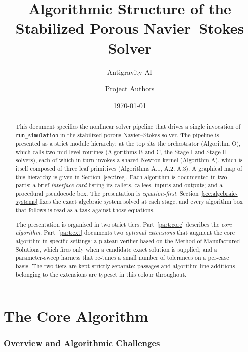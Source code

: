 \documentclass{article}
\title{Algorithmic Structure of the Stabilized Porous Navier--Stokes Solver}
\author{Antigravity AI \and Project Authors}
\date{\today}
\newcommand{\code}[1]{\texttt{\small #1}}
\newcommand{\extline}[1]{{\color{extcolor}#1}}
\begin{document}
\maketitle

\begin{abstract}
\sloppy
This document specifies the nonlinear solver pipeline that drives a
single invocation of \code{run\_simulation} in the stabilized porous
Navier--Stokes solver. The pipeline is presented as a strict module
hierarchy: at the top sits the orchestrator (Algorithm O), which calls
two mid-level routines (Algorithms B and C, the Stage I and Stage II
solvers), each of which in turn invokes a shared Newton kernel
(Algorithm A), which is itself composed of three leaf primitives
(Algorithms A.1, A.2, A.3). A graphical map of this hierarchy is given
in Section~\ref{sec:tree}. Each algorithm is documented in two parts:
a brief \emph{interface card} listing its callers, callees, inputs and
outputs; and a procedural pseudocode box. The presentation is
\emph{equation-first}: Section~\ref{sec:algebraic-systems} fixes the exact
algebraic system solved at each stage, and every algorithm box that
follows is read as a task against those equations.

The presentation is organised in two strict tiers. Part~\ref{part:core}
describes the \emph{core algorithm}. Part~\ref{part:ext} documents two
\emph{optional extensions} that augment the core algorithm in specific
settings: a plateau verifier based on the Method of Manufactured
Solutions, which fires only when a candidate exact solution is supplied;
and a parameter-sweep harness that re-tunes a small number of
tolerances on a per-case basis. The two tiers are kept strictly
separate: passages and algorithm-line additions belonging to the
extensions are typeset in \extline{this colour} throughout.
\end{abstract}

\tableofcontents

\part{The Core Algorithm}
\label{part:core}

\section{Overview and Algorithmic Challenges}
\label{sec:overview}
\end{document}
